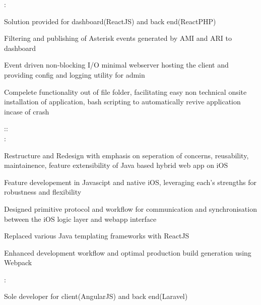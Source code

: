 \documentclass[]{hemant-style}
\begin{document}
\begin{minipage}[]{\textwidth}
\begin{minipage}{\textwidth}
\begin{minipage}[t][][c]{.75\textwidth}
                            :
                            \begin{hitemize}
                                \item Solution provided for dashboard(ReactJS) and back end(ReactPHP)
                                \item Filtering and publishing of Asterisk events generated by AMI and ARI to dashboard
                                \item Event driven non-blocking I/O minimal webserver hosting the client and  providing config and logging utility for admin
                                \item Compelete functionality out of file folder, facilitating easy non technical onsite installation of application, bash scripting to automatically revive  application incase of crash
                            \end{hitemize}
                            ::\\
                            :
                            \begin{hitemize}
                                \item Restructure and Redesign with emphasis on seperation of concerns, reusability, maintainence, feature extensibility of Java based hybrid web app on iOS
                                \item Feature developement in Javascipt and native iOS, leveraging each’s strengths for robustness and flexibility
                                \item Designed primitive protocol and workflow for communication and synchronisation between the iOS logic layer and webapp interface
                                \item Replaced various Java templating frameworks with ReactJS
                                \item Enhanced development workflow and optimal production build generation using Webpack
                            \end{hitemize}
                            :
                            \begin{hitemize}
                                \item Sole developer for client(AngularJS) and back end(Laravel)

\end{hitemize}
\end{minipage}
\end{minipage}
\end{minipage}
\end{document}
